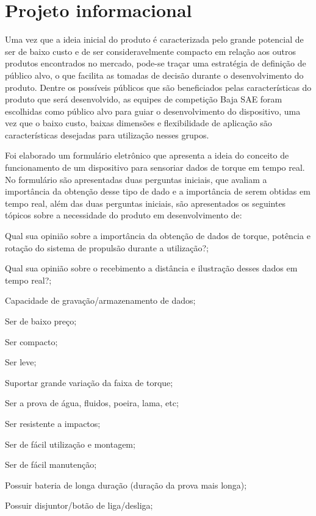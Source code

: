 \section{Projeto informacional}

Uma vez que a ideia inicial do produto é caracterizada pelo grande potencial de ser de baixo custo e de ser consideravelmente compacto em relação aos outros produtos
encontrados no mercado, pode-se traçar uma estratégia de definição de público alvo, o que facilita as tomadas de decisão durante o desenvolvimento do produto.
Dentre os possíveis públicos que são beneficiados pelas características do produto que será desenvolvido, as equipes de competição Baja SAE foram
escolhidas como público alvo para guiar o desenvolvimento do dispositivo, uma vez que o baixo custo, baixas dimensões e flexibilidade de aplicação são características
desejadas para utilização nesses grupos.

Foi elaborado um formulário eletrônico que apresenta a ideia do conceito de funcionamento de um dispositivo para sensoriar dados de torque em tempo real. No formulário
são apresentadas duas perguntas iniciais, que avaliam a importância da obtenção desse tipo de dado e a importância de serem obtidas em tempo real, além das duas perguntas
iniciais, são apresentados os seguintes tópicos sobre a necessidade do produto em desenvolvimento de:

\begin{alineas}

	\item Qual sua opinião sobre a importância da obtenção de dados de torque, potência e rotação do sistema de propulsão durante a utilização?;
	\item Qual sua opinião sobre o recebimento a distância e ilustração desses dados em tempo real?;
	\item Capacidade de gravação/armazenamento de dados;
	\item Ser de baixo preço;
	\item Ser compacto;
	\item Ser leve;
	\item Suportar grande variação da faixa de torque;
	\item Ser a prova de água, fluidos, poeira, lama, etc;
	\item Ser resistente a impactos;
	\item Ser de fácil utilização e montagem;
	\item Ser de fácil manutenção;
	\item Possuir bateria de longa duração (duração da prova mais longa);
	\item Possuir disjuntor/botão de liga/desliga;

\end{alineas}

